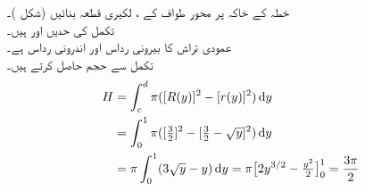 \quad
خطہ کے خاکہ پر محور طواف  کے ، لکیری قطعہ بنائیں (شکل )۔\\
\quad
تکمل کی حدیں  اور  ہیں۔\\
\quad
عمودی تراش کا بیرونی رداس  اور اندرونی رداس  ہے۔\\
\quad
تکمل سے حجم حاصل کرتے ہیں۔
\begin{align*}
H&=\int_c^d\pi([R(y)]^2-[r(y)]^2)\dif y\\
&=\int_0^1\pi([\tfrac{3}{2}]^2-[\tfrac{3}{2}-\sqrt{y}]^2)\dif y\\
&=\pi\int_0^1(3\sqrt{y}-y)\dif y=\pi\big[2y^{3/2}-\tfrac{y^2}{2}\big]_0^1=\frac{3\pi}{2}
\end{align*}
